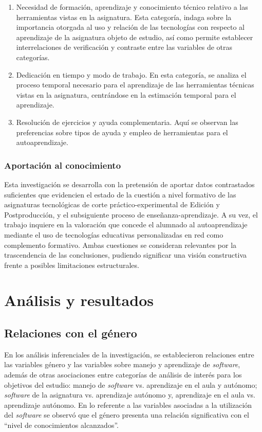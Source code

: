 \documentclass[spanish]{textolivre}
\begin{document}
\begin{enumerate}
    \item Necesidad de formación, aprendizaje y conocimiento técnico relativo a las herramientas vistas en la asignatura. Esta categoría, indaga sobre la importancia otorgada al uso y relación de las tecnologías con respecto al aprendizaje de la asignatura objeto de estudio, así como permite establecer interrelaciones de verificación y contraste entre las variables de otras categorías. 
    \item Dedicación en tiempo y modo de trabajo. En esta categoría, se analiza el proceso temporal necesario para el aprendizaje de las herramientas técnicas vistas en la asignatura, centrándose en la estimación temporal para el aprendizaje. 
    \item Resolución de ejercicios y ayuda complementaria. Aquí se observan las preferencias sobre tipos de ayuda y empleo de herramientas para el autoaprendizaje.
\end{enumerate}

\subsubsection{Aportación al conocimiento}\label{sec-titulo}
Esta investigación se desarrolla con la pretensión de aportar datos contrastados suficientes que evidencien el estado de la cuestión a nivel formativo de las asignaturas tecnológicas de corte práctico-experimental de Edición y Postproducción, y el subsiguiente proceso de enseñanza-aprendizaje. A su vez, el trabajo inquiere en la valoración que concede el alumnado al autoaprendizaje mediante el uso de tecnologías educativas personalizadas en red como complemento formativo. Ambas cuestiones se consideran relevantes por la trascendencia de las conclusiones, pudiendo significar una visión constructiva frente a posibles limitaciones estructurales. 

\section{Análisis y resultados}\label{sec-autores}
\subsection{Relaciones con el género}
En los análisis inferenciales de la investigación, se establecieron relaciones entre las variables género y las variables sobre manejo y aprendizaje de \textit{software}, además de otras asociaciones entre categorías de análisis de interés para los objetivos del estudio: manejo de \textit{software} vs. aprendizaje en el aula y autónomo; \textit{software} de la asignatura vs. aprendizaje autónomo y, aprendizaje en el aula vs. aprendizaje autónomo. En lo referente a las variables asociadas a la utilización del \textit{software} se observó que el género presenta una relación significativa con el “nivel de conocimientos alcanzados”.
\end{document}
